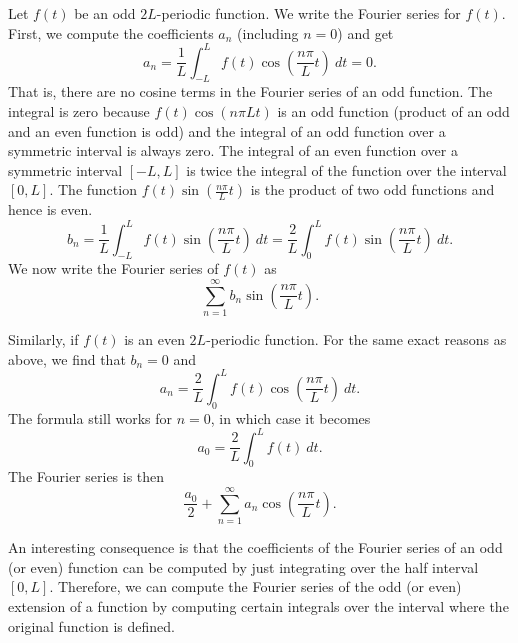 Let $f(t)$ be an odd $2L$-periodic function.  We write 
the Fourier series for $f(t)$.  First, we compute the coefficients $a_n$ (including
$n=0$) and get
\begin{equation*}
a_n = \frac{1}{L} \int_{-L}^L f(t) \cos \left( \frac{n \pi}{L} t \right)
~ dt = 0 .
\end{equation*}
That is, there are no cosine terms in the Fourier series of an odd function.
The integral is zero
because $f(t) \cos \left( {n \pi}{L} t \right)$
is an odd function (product of an odd and an
even function is odd) and the integral of an odd function over a symmetric
interval is always zero.
The integral of an even function over a symmetric interval
$[-L,L]$ is twice the integral of the function over the interval $[0,L]$.
The function $f(t) \sin \left( \frac{n \pi}{L} t \right)$ is the product of two odd
functions and hence is even.
\begin{equation*}
b_n = 
\frac{1}{L} \int_{-L}^L f(t) \sin \left( \frac{n \pi}{L} t \right) ~ dt =
\frac{2}{L} \int_{0}^L f(t) \sin \left( \frac{n \pi}{L} t \right) ~ dt .
\end{equation*}
We now write the Fourier series of $f(t)$ as
\begin{equation*}
\sum_{n=1}^\infty b_n \sin \left( \frac{n \pi}{L} t \right) .
\end{equation*}

Similarly, if $f(t)$ is an even $2L$-periodic function.  For the same exact
reasons as above, we find that $b_n = 0$ and
\begin{equation*}
a_n = 
\frac{2}{L} \int_{0}^L f(t) \cos \left( \frac{n \pi}{L} t \right) ~ dt .
\end{equation*}
The formula still works for $n=0$, in which case it becomes
\begin{equation*}
a_0 = 
\frac{2}{L} \int_{0}^L f(t) ~ dt .
\end{equation*}
The Fourier series is then
\begin{equation*}
\frac{a_0}{2}
+
\sum_{n=1}^\infty a_n \cos \left( \frac{n \pi}{L} t \right) .
\end{equation*}

An interesting consequence is that the coefficients of the Fourier series of
an odd (or even) function can be computed by just integrating over the half
interval $[0,L]$.  Therefore, we can compute the Fourier series of
the odd (or even) extension of a
function by computing certain integrals over the interval
where the original function is defined.

